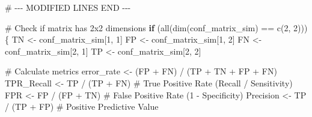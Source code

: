 \documentclass[
  letterpaper,
  DIV=11,
  numbers=noendperiod]{scrreprt}
\newenvironment{Shaded}{\begin{snugshade}}{\end{snugshade}}
\newcommand{\CommentTok}[1]{\textcolor[rgb]{0.37,0.37,0.37}{#1}}
\newcommand{\ControlFlowTok}[1]{\textcolor[rgb]{0.00,0.23,0.31}{\textbf{#1}}}
\newcommand{\DecValTok}[1]{\textcolor[rgb]{0.68,0.00,0.00}{#1}}
\newcommand{\FunctionTok}[1]{\textcolor[rgb]{0.28,0.35,0.67}{#1}}
\newcommand{\NormalTok}[1]{\textcolor[rgb]{0.00,0.23,0.31}{#1}}
\newcommand{\OtherTok}[1]{\textcolor[rgb]{0.00,0.23,0.31}{#1}}
\newcommand{\RegionMarkerTok}[1]{\textcolor[rgb]{0.00,0.23,0.31}{#1}}
\newcommand{\SpecialCharTok}[1]{\textcolor[rgb]{0.37,0.37,0.37}{#1}}
\begin{document}
\begin{Shaded}
\begin{Highlighting}[]
\CommentTok{\# {-}{-}{-} MODIFIED LINES }\RegionMarkerTok{END}\CommentTok{ {-}{-}{-}}


\CommentTok{\# Check if matrix has 2x2 dimensions}
\ControlFlowTok{if}\NormalTok{ (}\FunctionTok{all}\NormalTok{(}\FunctionTok{dim}\NormalTok{(conf\_matrix\_sim) }\SpecialCharTok{==} \FunctionTok{c}\NormalTok{(}\DecValTok{2}\NormalTok{, }\DecValTok{2}\NormalTok{))) \{}
\NormalTok{  TN }\OtherTok{\textless{}{-}}\NormalTok{ conf\_matrix\_sim[}\DecValTok{1}\NormalTok{, }\DecValTok{1}\NormalTok{]}
\NormalTok{  FP }\OtherTok{\textless{}{-}}\NormalTok{ conf\_matrix\_sim[}\DecValTok{1}\NormalTok{, }\DecValTok{2}\NormalTok{]}
\NormalTok{  FN }\OtherTok{\textless{}{-}}\NormalTok{ conf\_matrix\_sim[}\DecValTok{2}\NormalTok{, }\DecValTok{1}\NormalTok{]}
\NormalTok{  TP }\OtherTok{\textless{}{-}}\NormalTok{ conf\_matrix\_sim[}\DecValTok{2}\NormalTok{, }\DecValTok{2}\NormalTok{]}

  \CommentTok{\# Calculate metrics}
\NormalTok{  error\_rate }\OtherTok{\textless{}{-}}\NormalTok{ (FP }\SpecialCharTok{+}\NormalTok{ FN) }\SpecialCharTok{/}\NormalTok{ (TP }\SpecialCharTok{+}\NormalTok{ TN }\SpecialCharTok{+}\NormalTok{ FP }\SpecialCharTok{+}\NormalTok{ FN)}
\NormalTok{  TPR\_Recall }\OtherTok{\textless{}{-}}\NormalTok{ TP }\SpecialCharTok{/}\NormalTok{ (TP }\SpecialCharTok{+}\NormalTok{ FN) }\CommentTok{\# True Positive Rate (Recall / Sensitivity)}
\NormalTok{  FPR }\OtherTok{\textless{}{-}}\NormalTok{ FP }\SpecialCharTok{/}\NormalTok{ (FP }\SpecialCharTok{+}\NormalTok{ TN)      }\CommentTok{\# False Positive Rate (1 {-} Specificity)}
\NormalTok{  Precision }\OtherTok{\textless{}{-}}\NormalTok{ TP }\SpecialCharTok{/}\NormalTok{ (TP }\SpecialCharTok{+}\NormalTok{ FP)  }\CommentTok{\# Positive Predictive Value}


\end{Highlighting}
\end{Shaded}
\end{document}
